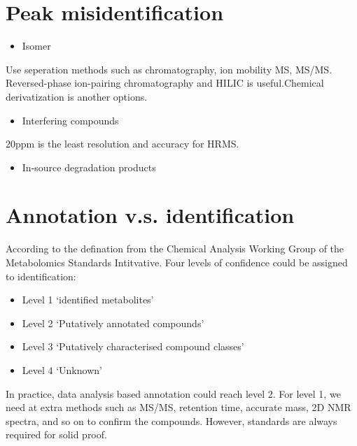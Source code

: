\documentclass[
]{book}
\providecommand{\tightlist}{%
  \setlength{\itemsep}{0pt}\setlength{\parskip}{0pt}}
\begin{document}
\hypertarget{peak-misidentification}{%
\section{Peak misidentification}\label{peak-misidentification}}

\begin{itemize}
\tightlist
\item
  Isomer
\end{itemize}

Use seperation methods such as chromatography, ion mobility MS, MS/MS. Reversed-phase ion-pairing chromatography and HILIC is useful.Chemical derivatization is another options.

\begin{itemize}
\tightlist
\item
  Interfering compounds
\end{itemize}

20ppm is the least resolution and accuracy for HRMS.

\begin{itemize}
\tightlist
\item
  In-source degradation products
\end{itemize}

\hypertarget{annotation-v.s.-identification}{%
\section{Annotation v.s. identification}\label{annotation-v.s.-identification}}

According to the defination from the Chemical Analysis Working Group of the Metabolomics Standards Intitvative\citep{sumner2007, viant2017}. Four levels of confidence could be assigned to identification:

\begin{itemize}
\tightlist
\item
  Level 1 `identified metabolites'
\item
  Level 2 `Putatively annotated compounds'
\item
  Level 3 `Putatively characterised compound classes'
\item
  Level 4 `Unknown'
\end{itemize}

In practice, data analysis based annotation could reach level 2. For level 1, we need at extra methods such as MS/MS, retention time, accurate mass, 2D NMR spectra, and so on to confirm the compounds. However, standards are always required for solid proof.
\end{document}

